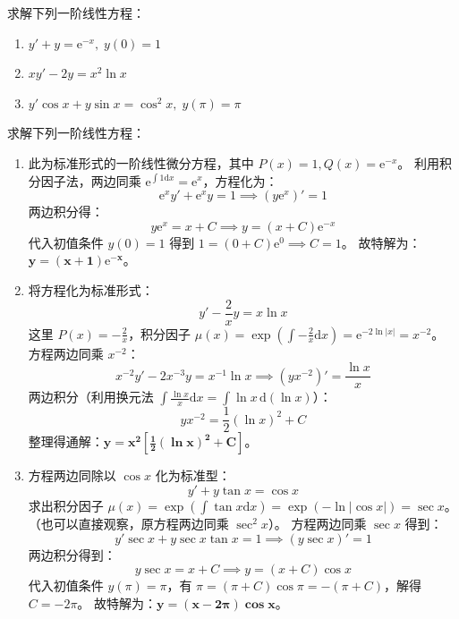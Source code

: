 \documentclass[lang=cn,11pt]{elegantbook}
\begin{document}
\begin{exercise}[基础：直接套用公式或常数变易法]
求解下列一阶线性方程：
\begin{enumerate}
  \item[(1)] $y'+y=\mathrm{e}^{-x},\; y(0)=1$
  \item[(2)] $xy'-2y=x^{2}\ln x$
  \item[(3)] $y'\cos x+y\sin x=\cos^{2}x,\; y(\pi)=\pi$
\end{enumerate}
\end{exercise}
\begin{solution}
求解下列一阶线性方程：
\begin{enumerate}
  \item[(1)] 
此为标准形式的一阶线性微分方程，其中 $P(x)=1, Q(x)=\mathrm{e}^{-x}$。
利用积分因子法，两边同乘 $\mathrm{e}^{\int 1 \mathrm{d}x} = \mathrm{e}^{x}$，方程化为：
\[
\mathrm{e}^{x}y' + \mathrm{e}^{x}y = 1 \implies (y\mathrm{e}^{x})' = 1
\]
两边积分得：
\[
y\mathrm{e}^{x} = x + C \implies y = (x+C)\mathrm{e}^{-x}
\]
代入初值条件 $y(0)=1$ 得到 $1 = (0+C)\mathrm{e}^{0} \implies C=1$。
故特解为：$\mathbf{y = (x+1)\mathrm{e}^{-x}}$。
\item[(2)]
将方程化为标准形式：
\[
y' - \frac{2}{x}y = x\ln x
\]
这里 $P(x) = -\frac{2}{x}$，积分因子 $\mu(x) = \exp\!\left(\int-\frac{2}{x}\mathrm{d}x\right) = \mathrm{e}^{-2\ln|x|} = x^{-2}$。
方程两边同乘 $x^{-2}$：
\[
x^{-2}y' - 2x^{-3}y = x^{-1}\ln x \implies (yx^{-2})' = \frac{\ln x}{x}
\]
两边积分（利用换元法 $\int \frac{\ln x}{x}\mathrm{d}x = \int \ln x\,\mathrm{d}(\ln x)$）：
\[
yx^{-2} = \frac{1}{2}(\ln x)^2 + C
\]
整理得通解：$\mathbf{y = x^2\left[ \frac{1}{2}(\ln x)^2 + C \right]}$。
\item[(3)]方程两边同除以 $\cos x$ 化为标准型：
\[
y' + y\tan x = \cos x
\]
求出积分因子 $\mu(x) = \exp\!\left(\int\tan x\mathrm{d}x\right) = \exp(-\ln|\cos x|) = \sec x$。
（也可以直接观察，原方程两边同乘 $\sec^2 x$）。
方程两边同乘 $\sec x$ 得到：
\[
y'\sec x + y\sec x\tan x = 1 \implies (y\sec x)' = 1
\]
两边积分得到：
\[
y\sec x = x + C \implies y = (x+C)\cos x
\]
代入初值条件 $y(\pi)=\pi$，有 $\pi = (\pi+C)\cos\pi = -(\pi+C)$，解得 $C = -2\pi$。
故特解为：$\mathbf{y = (x-2\pi)\cos x}$。
\end{enumerate}
\end{solution}
\end{document}
